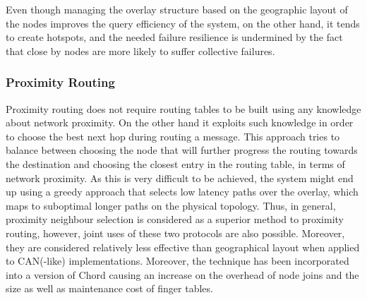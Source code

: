 Even though managing the overlay structure based on the geographic layout of the
nodes improves the query efficiency of the system, on the other hand, it tends
to create hotspots, and the needed failure resilience is undermined by the fact
that close by nodes are more likely to suffer collective failures.


%
%
%

\subsubsection{Proximity Routing}
Proximity routing does not require routing tables to be built using any
knowledge about network proximity. On the other hand it exploits such knowledge
in order to choose the best next hop during routing a message. This approach
tries to balance between choosing the node that will further progress the
routing towards the destination and choosing the closest entry in the routing
table, in terms of network proximity. As this is very difficult to be achieved,
the system might end up using a greedy approach that selects low latency paths
over the overlay, which maps to suboptimal longer paths on the physical
topology. Thus, in general, proximity neighbour selection is considered as a
superior method to proximity routing, however, joint uses of these two protocols
are also possible. Moreover, they are considered relatively less effective than
geographical layout when applied to CAN(-like) implementations. Moreover, the
technique has been incorporated into a version of Chord causing an increase on
the overhead of node joins and the size as well as maintenance cost of finger
tables.

